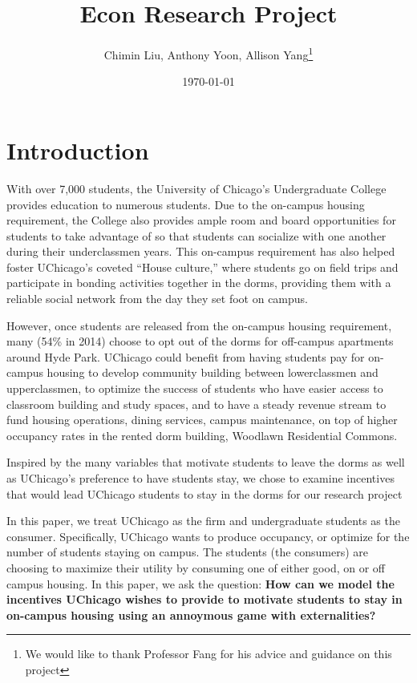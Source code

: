 \documentclass[12pt]{article}
\title{Econ Research Project}
\author{Chimin Liu, Anthony Yoon, Allison Yang\thanks{We would like to thank Professor Fang for his advice and guidance on this project}}
\date{\today}
\begin{document}
\maketitle
\tableofcontents
\newpage
\section{Introduction}
With over 7,000 students, the University of Chicago’s Undergraduate College provides education to numerous students. Due to the on-campus housing requirement, the College also provides ample room and board opportunities for students to take advantage of so that students can socialize with one another during their underclassmen years. This on-campus requirement has also helped foster UChicago’s coveted “House culture,” where students go on field trips and participate in bonding activities together in the dorms, providing them with a reliable social network from the day they set foot on campus.


However, once students are released from the on-campus housing requirement, many (54\% in 2014) choose to opt out of the dorms for off-campus apartments around Hyde Park. UChicago could benefit from having students pay for on-campus housing to develop community building between lowerclassmen and upperclassmen, to optimize the success of students who have easier access to classroom building and study spaces, and to have a steady revenue stream to fund housing operations, dining services, campus maintenance, on top of higher occupancy rates in the rented dorm building, Woodlawn Residential Commons. 


Inspired by the many variables that motivate students to leave the dorms as well as UChicago’s preference to have students stay, we chose to examine incentives that would lead UChicago students to stay in the dorms for our research project


In this paper, we treat UChicago as the firm and undergraduate students as the consumer. Specifically, UChicago wants to produce occupancy, or optimize for the number of students staying on campus. The students (the consumers) are choosing to maximize their utility by consuming one of either good, on or off campus housing. In this paper, we ask the question: \textbf{How can we model the incentives UChicago wishes to provide to motivate students to stay in on-campus housing using an annoymous game with externalities?}
\end{document}
